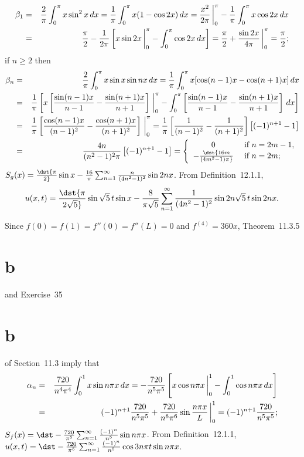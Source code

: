 \documentclass[dvips]{book}
\renewcommand{\exer}[1]{\par\medskip\;\noindent{\color{red}\bf #1.}}
\numberwithin{example}{section}
\numberwithin{equation}{section}
\numberwithin{theorem}{section}
\numberwithin{table}{section}
\numberwithin{figure}{section}
\newcommand{\lims}[2]{\,\bigg|_{#1}^{#2}}
\begin{document}
\exer{12.2.12}
\begin{eqnarray*}
\beta_1&=&{2\over\pi}\int_0^\pi x\sin^2 x\,dx=
{1\over \pi}\int_0^\pi x(1-\cos2x)\,dx
={x^2\over2\pi}\lims0\pi
-{1\over\pi}\int_0^\pi x\cos2x\,dx\\
&=&{\pi\over2}-{1\over2\pi}\left[x\sin2x\lims0\pi-\int_0^\pi
\cos2x\,dx\right]
={\pi\over2}+{\sin2x\over4\pi}\lims0\pi={\pi\over2};
\end{eqnarray*}
if $n\ge2$ then
\begin{eqnarray*}
\beta_n&=&
{2\over\pi}\int_0^\pi x\sin x\sin nx\,dx
={1\over\pi}\int_0^\pi x[\cos(n-1)x-\cos(n+1)x]\,dx\\
&=&{1\over\pi}\left[x\left[{\sin(n-1)x\over n-1}-
{\sin(n+1)x\over n+1}\right]\lims0\pi-\int_0^\pi
\left[{\sin(n-1)x\over n-1}-{\sin(n+1)x\over n+1}\right]\,dx\right]\\
&=&{1\over\pi}\left[{\cos(n-1)x \over(n-1)^2}
-{\cos(n+1)x\over(n+1)^2}\right]\lims0\pi
={1\over\pi}\left[{1\over(n-1)^2}-{1\over(n+1)^2}\right]
\left[(-1)^{n+1}-1\right]\\
&=&{4n\over(n^2-1)^2\pi}\left[(-1)^{n+1}-1\right]=
\left\{\begin{array}{cl}
0& \mbox{ if }n=2m-1,\\
-\dst{16m\over(4m^2-1)\pi}&\mbox{ if }n=2m;
\end{array}\right.
\end{eqnarray*}
$S_g(x)=\dst{\pi\over2}\sin x-{16\over\pi}
\sum_{n=1}^\infty{n\over(4n^2-1)^2}\sin 2nx$.
From Definition~12.1.1,
$$
u(x,t)=\dst{\pi\over2\sqrt5}\sin\sqrt{5}\,t\sin x-{8\over\pi\sqrt5}
\sum_{n=1}^\infty{1\over(4n^2-1)^2}\sin2n\sqrt5\,t\sin 2nx.
$$


\exer{12.2.14}
Since $f(0)=f(1)=f''(0)=f''(L)=0$ and $f^{(4)}=360x$,
Theorem~11.3.5\part{b} and Exercise~35\part{b} of
Section~11.3  imply that
\begin{eqnarray*}
\alpha_n&=&
{720\over n^4\pi^4}\int_0^1x\sin n\pi x\,dx
=-{720\over n^5\pi^5}\left[x\cos n\pi x
\lims01-\int_0^1\cos n\pi x
\,dx\right]\\
&=&(-1)^{n+1}{720\over n^5\pi^5}+{720\over n^6\pi^6}\sin{n\pi
x\over L}\lims01=
(-1)^{n+1}{720\over n^5\pi^5};
\end{eqnarray*}
$S_f(x)=\dst-{720\over\pi^5}\sum_{n=1}^\infty{(-1)^n\over n^5}\sin
n\pi x$.
From Definition~12.1.1,
$u(x,t)=\dst-{720\over\pi^5}\sum_{n=1}^\infty{(-1)^n\over n^5}
\cos3n\pi t\sin n\pi x$.
\end{document}
